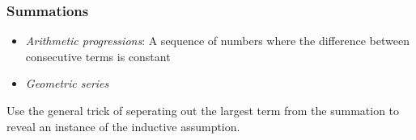 \noindent{}

\subsubsection{Summations}

\begin{itemize}
\itemsep1pt\parskip0pt
\item
  \emph{Arithmetic progressions}: A sequence of numbers where the difference between consecutive terms is constant
\item
  \emph{Geometric series}
\end{itemize}

Use the general trick of seperating out the largest term from the summation to reveal an instance of the inductive assumption. \\